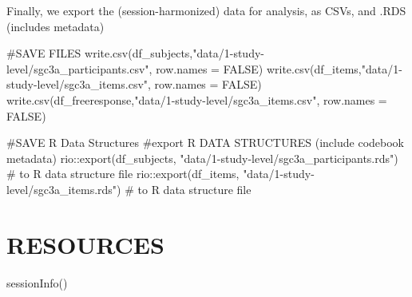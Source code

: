 \documentclass[
  letterpaper,
  DIV=11,
  numbers=noendperiod]{scrreprt}
\newenvironment{Shaded}{\begin{snugshade}}{\end{snugshade}}
\newcommand{\AttributeTok}[1]{\textcolor[rgb]{0.40,0.45,0.13}{#1}}
\newcommand{\CommentTok}[1]{\textcolor[rgb]{0.37,0.37,0.37}{#1}}
\newcommand{\ConstantTok}[1]{\textcolor[rgb]{0.56,0.35,0.01}{#1}}
\newcommand{\FunctionTok}[1]{\textcolor[rgb]{0.28,0.35,0.67}{#1}}
\newcommand{\NormalTok}[1]{\textcolor[rgb]{0.00,0.23,0.31}{#1}}
\newcommand{\SpecialCharTok}[1]{\textcolor[rgb]{0.37,0.37,0.37}{#1}}
\newcommand{\StringTok}[1]{\textcolor[rgb]{0.13,0.47,0.30}{#1}}
\begin{document}
Finally, we export the (session-harmonized) data for analysis, as CSVs,
and .RDS (includes metadata)

\begin{Shaded}
\begin{Highlighting}[]
\CommentTok{\#SAVE FILES}
\FunctionTok{write.csv}\NormalTok{(df\_subjects,}\StringTok{"data/1{-}study{-}level/sgc3a\_participants.csv"}\NormalTok{, }\AttributeTok{row.names =} \ConstantTok{FALSE}\NormalTok{)}
\FunctionTok{write.csv}\NormalTok{(df\_items,}\StringTok{"data/1{-}study{-}level/sgc3a\_items.csv"}\NormalTok{, }\AttributeTok{row.names =} \ConstantTok{FALSE}\NormalTok{)}
\FunctionTok{write.csv}\NormalTok{(df\_freeresponse,}\StringTok{"data/1{-}study{-}level/sgc3a\_items.csv"}\NormalTok{, }\AttributeTok{row.names =} \ConstantTok{FALSE}\NormalTok{)}

\CommentTok{\#SAVE R Data Structures }
\CommentTok{\#export R DATA STRUCTURES (include codebook metadata)}
\NormalTok{rio}\SpecialCharTok{::}\FunctionTok{export}\NormalTok{(df\_subjects, }\StringTok{"data/1{-}study{-}level/sgc3a\_participants.rds"}\NormalTok{) }\CommentTok{\# to R data structure file}
\NormalTok{rio}\SpecialCharTok{::}\FunctionTok{export}\NormalTok{(df\_items, }\StringTok{"data/1{-}study{-}level/sgc3a\_items.rds"}\NormalTok{) }\CommentTok{\# to R data structure file}
\end{Highlighting}
\end{Shaded}

\hypertarget{resources}{%
\section{RESOURCES}\label{resources}}

\begin{Shaded}
\begin{Highlighting}[]
\FunctionTok{sessionInfo}\NormalTok{()}
\end{Highlighting}
\end{Shaded}
\end{document}
